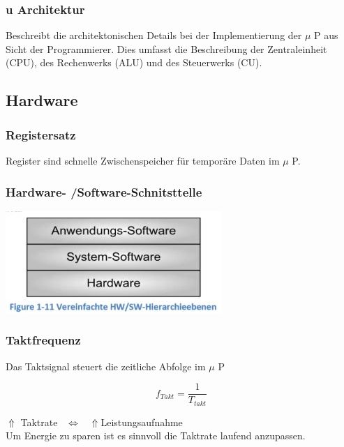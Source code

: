 \subsubsection{u Architektur}
Beschreibt die architektonischen Details bei der Implementierung der $\mu$ P aus Sicht der Programmierer.
Dies umfasst die Beschreibung der Zentraleinheit (CPU), des Rechenwerks (ALU) und des Steuerwerks (CU).


\clearpage

\subsection{Hardware}
\begin{minipage}[t]{10cm}
	\subsubsection{Registersatz}
	Register sind schnelle Zwischenspeicher für \newline
	temporäre Daten im $\mu$ P.
\end{minipage}
\begin{minipage}[t]{0.5\linewidth}
	\subsubsection{Hardware- /Software-Schnitsttelle}
	\includegraphics{images/HardwareSoftware}
\end{minipage}

\subsubsection{Taktfrequenz}
Das Taktsignal steuert die zeitliche Abfolge im $\mu$ P \newline
\begin{multicols}{2}
        \begin{minipage}{\linewidth}
    \[ f_{Takt}= \frac{1}{T_{takt}} \]
        \end{minipage}
    
    \begin{minipage}{\linewidth}
        $ \Uparrow $ Taktrate \-\ $ \Leftrightarrow $ \-\ $  \Uparrow  $Leistungsaufnahme \\
        Um Energie zu sparen ist es sinnvoll die Taktrate laufend anzupassen.\\
    \end{minipage}
\end{multicols}
